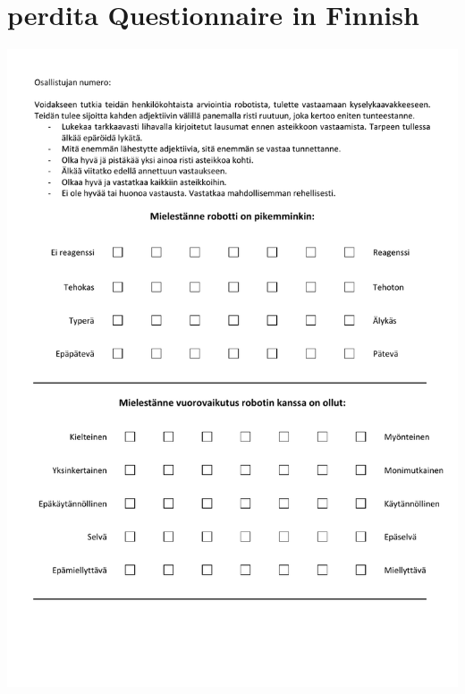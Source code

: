 \section{\acrshort{perdita} Questionnaire in Finnish}\label{app:perdita_fi}
\begin{center}
	\includegraphics[page=1, width=\textwidth]{figures/annexe1/1PeRDITA_vParticipantFINNOIS.pdf} 
\end{center}

